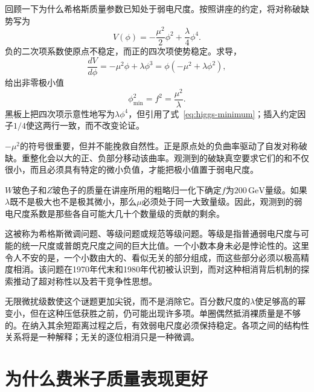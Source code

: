 \begin{classroomqa}
\end{classroomqa}

回顾一下为什么希格斯质量参数已知处于弱电尺度。按照讲座的约定，将对称破缺势写为
\begin{equation}
V(\phi)=-\frac{\mu^2}{2}\phi^2+\frac{\lambda}{4}\phi^4.
\label{eq:higgs-potential}
\end{equation}
负的二次项系数使原点不稳定，而正的四次项使势稳定。求导，
\begin{equation}
\frac{dV}{d\phi}=-\mu^2\phi+\lambda\phi^3
=\phi(-\mu^2+\lambda\phi^2),
\end{equation}
给出非零极小值
\begin{equation}
\phi_{\min}^2=f^2=\frac{\mu^2}{\lambda}.
\label{eq:higgs-minimum}
\end{equation}
黑板上把四次项示意性地写为\(\lambda\phi^4\)，但引用了式~\eqref{eq:higgs-minimum}；插入约定因子\(1/4\)使这两行一致，而不改变论证。

\(-\mu^2\)的符号很重要，但并不能挽救自然性。正是原点处的负曲率驱动了自发对称破缺。重整化会以大的正、负部分移动该曲率。观测到的破缺真空要求它们的和不仅很小，而且必须具有特定的微小负值，才能把极小值置于弱电尺度。

\(W\)玻色子和\(Z\)玻色子的质量在讲座所用的粗略归一化下确定\(f\)为\(200\,\mathrm{GeV}\)量级。如果\(\lambda\)既不是极大也不是极其微小，那么\(\mu\)必须处于同一大致量级。因此，观测到的弱电尺度系数是那些各自可能大几十个数量级的贡献的剩余。

这被称为希格斯微调问题、等级问题或规范等级问题。等级是指普通弱电尺度与可能的统一尺度或普朗克尺度之间的巨大比值。一个小数本身未必是悖论性的。这里令人不安的是，一个小数由大的、看似无关的部分组成，而这些部分必须以极高精度相消。该问题在1970年代末和1980年代初被认识到，而对这种相消背后机制的探索推动了超对称性以及若干竞争性思想。

无限微扰级数使这个谜题更加尖锐，而不是消除它。百分数尺度的\(\lambda\)使足够高的幂变小，但在这种压低获胜之前，仍可能出现许多项。单圈偶然抵消裸质量是不够的。在纳入其余短距离过程之后，有效弱电尺度必须保持稳定。各项之间的结构性关系将是一种解释；无关的逐位相消只是一种微调。

\section{为什么费米子质量表现更好}

